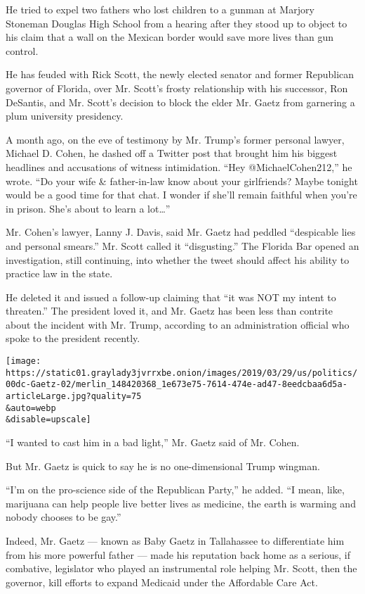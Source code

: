 He tried to expel two fathers who lost children to a gunman at Marjory
Stoneman Douglas High School from a hearing after they stood up to
object to his claim that a wall on the Mexican border would save more
lives than gun control.

He has feuded with Rick Scott, the newly elected senator and former
Republican governor of Florida, over Mr. Scott's frosty relationship
with his successor, Ron DeSantis, and Mr. Scott's decision to block the
elder Mr. Gaetz from garnering a plum university presidency.

A month ago, on the eve of testimony by Mr. Trump's former personal
lawyer, Michael D. Cohen, he dashed off a Twitter post that brought him
his biggest headlines and accusations of witness intimidation. ``Hey
@MichaelCohen212,'' he wrote. ``Do your wife \& father-in-law know about
your girlfriends? Maybe tonight would be a good time for that chat. I
wonder if she'll remain faithful when you're in prison. She's about to
learn a lot\ldots{}''

Mr. Cohen's lawyer, Lanny J. Davis, said Mr. Gaetz had peddled
``despicable lies and personal smears.'' Mr. Scott called it
``disgusting.'' The Florida Bar opened an investigation, still
continuing, into whether the tweet should affect his ability to practice
law in the state.

He deleted it and issued a follow-up claiming that ``it was NOT my
intent to threaten.'' The president loved it, and Mr. Gaetz has been
less than contrite about the incident with Mr. Trump, according to an
administration official who spoke to the president recently.

\texttt{[image: https://static01.graylady3jvrrxbe.onion/images/2019/03/29/us/politics/00dc-Gaetz-02/merlin\_148420368\_1e673e75-7614-474e-ad47-8eedcbaa6d5a-articleLarge.jpg?quality=75\\\&auto=webp\\\&disable=upscale]}

``I wanted to cast him in a bad light,'' Mr. Gaetz said of Mr. Cohen.

But Mr. Gaetz is quick to say he is no one-dimensional Trump wingman.

``I'm on the pro-science side of the Republican Party,'' he added. ``I
mean, like, marijuana can help people live better lives as medicine, the
earth is warming and nobody chooses to be gay.''

Indeed, Mr. Gaetz --- known as Baby Gaetz in Tallahassee to
differentiate him from his more powerful father --- made his reputation
back home as a serious, if combative, legislator who played an
instrumental role helping Mr. Scott, then the governor, kill efforts to
expand Medicaid under the Affordable Care Act.

